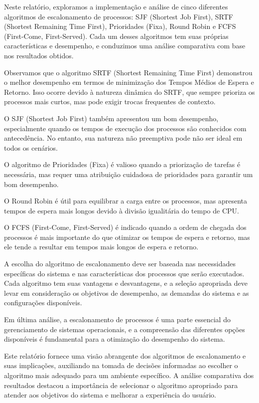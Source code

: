 \documentclass[
	12pt,				%
	openright,			%
	oneside,			%
	a4paper,			%
	chapter=TITLE,		%
	english,			%
	french,				%
	spanish,			%
	brazil				%
	]{abntex2}
\theoremstyle{definition}
\begin{document}
Neste relatório, exploramos a implementação e análise de cinco diferentes algoritmos de escalonamento de processos: SJF (Shortest Job First), SRTF (Shortest Remaining Time First), Prioridades (Fixa), Round Robin e FCFS (First-Come, First-Served). Cada um desses algoritmos tem suas próprias características e desempenho, e conduzimos uma análise comparativa com base nos resultados obtidos.

Observamos que o algoritmo SRTF (Shortest Remaining Time First) demonstrou o melhor desempenho em termos de minimização dos Tempos Médios de Espera e Retorno. Isso ocorre devido à natureza dinâmica do SRTF, que sempre prioriza os processos mais curtos, mas pode exigir trocas frequentes de contexto.

O SJF (Shortest Job First) também apresentou um bom desempenho, especialmente quando os tempos de execução dos processos são conhecidos com antecedência. No entanto, sua natureza não preemptiva pode não ser ideal em todos os cenários.

O algoritmo de Prioridades (Fixa) é valioso quando a priorização de tarefas é necessária, mas requer uma atribuição cuidadosa de prioridades para garantir um bom desempenho.

O Round Robin é útil para equilibrar a carga entre os processos, mas apresenta tempos de espera mais longos devido à divisão igualitária do tempo de CPU.

O FCFS (First-Come, First-Served) é indicado quando a ordem de chegada dos processos é mais importante do que otimizar os tempos de espera e retorno, mas ele tende a resultar em tempos mais longos de espera e retorno.

A escolha do algoritmo de escalonamento deve ser baseada nas necessidades específicas do sistema e nas características dos processos que serão executados. Cada algoritmo tem suas vantagens e desvantagens, e a seleção apropriada deve levar em consideração os objetivos de desempenho, as demandas do sistema e as configurações disponíveis.

Em última análise, a escalonamento de processos é uma parte essencial do gerenciamento de sistemas operacionais, e a compreensão das diferentes opções disponíveis é fundamental para a otimização do desempenho do sistema.

Este relatório fornece uma visão abrangente dos algoritmos de escalonamento e suas implicações, auxiliando na tomada de decisões informadas ao escolher o algoritmo mais adequado para um ambiente específico. A análise comparativa dos resultados destacou a importância de selecionar o algoritmo apropriado para atender aos objetivos do sistema e melhorar a experiência do usuário.

\postextual



\cite{tanenbaum2010sistemas}
\end{document}
